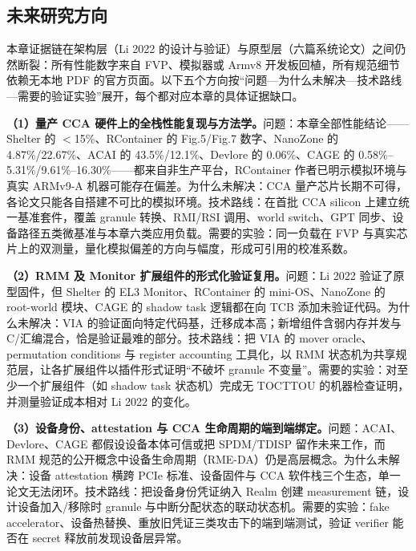 \documentclass[11pt]{ctexart}
\begin{document}
\subsection{未来研究方向}
本章证据链在架构层（Li 2022 的设计与验证）与原型层（六篇系统论文）之间仍然断裂：所有性能数字来自 FVP、模拟器或 Armv8 开发板回植，所有规范细节依赖无本地 PDF 的官方页面。以下五个方向按“问题—为什么未解决—技术路线—需要的验证实验”展开，每个都对应本章的具体证据缺口。\par
\noindent\textbf{（1）量产 CCA 硬件上的全栈性能复现与方法学。}问题：本章全部性能结论——Shelter 的 $<$15\%\cite{zhang2023shelter}、RContainer 的 Fig.5/Fig.7 数字\cite{zhou2025rcontainer}、NanoZone 的 4.87\%/22.67\%\cite{liu2025nanozone}、ACAI 的 43.5\%/12.1\%\cite{acai2023}、Devlore 的 0.06\%\cite{bertschi2026devlore}、CAGE 的 0.58\%--5.31\%/9.61\%--16.30\%\cite{wang2026cage}——都来自非生产平台，RContainer 作者已明示模拟环境与真实 ARMv9-A 机器可能存在偏差。为什么未解决：CCA 量产芯片长期不可得，各论文只能各自搭建不可比的模拟环境。技术路线：在首批 CCA silicon 上建立统一基准套件，覆盖 granule 转换、RMI/RSI 调用、world switch、GPT 同步、设备路径五类微基准与本章六类应用负载。需要的实验：同一负载在 FVP 与真实芯片上的双测量，量化模拟偏差的方向与幅度，形成可引用的校准系数。\par
\noindent\textbf{（2）RMM 及 Monitor 扩展组件的形式化验证复用。}问题：Li 2022 验证了原型固件，但 Shelter 的 EL3 Monitor、RContainer 的 mini-OS、NanoZone 的 root-world 模块、CAGE 的 shadow task 逻辑都在向 TCB 添加未验证代码\cite{li2022cca,zhang2023shelter,zhou2025rcontainer,liu2025nanozone,wang2026cage}。为什么未解决：VIA 的验证面向特定代码基，迁移成本高；新增组件含弱内存并发与 C/汇编混合，恰是验证最难的部分。技术路线：把 VIA 的 mover oracle、permutation conditions 与 register accounting 工具化，以 RMM 状态机为共享规范层，让各扩展组件以插件形式证明“不破坏 granule 不变量”。需要的实验：对至少一个扩展组件（如 shadow task 状态机）完成无 TOCTTOU 的机器检查证明，并测量验证成本相对 Li 2022 的变化。\par
\noindent\textbf{（3）设备身份、attestation 与 CCA 生命周期的端到端绑定。}问题：ACAI、Devlore、CAGE 都假设设备本体可信或把 SPDM/TDISP 留作未来工作\cite{acai2023,bertschi2026devlore,wang2026cage}，而 RMM 规范的公开概念中设备生命周期（RME-DA）仍是高层概念\cite{arm_rmm_spec,arm_cca_spec}。为什么未解决：设备 attestation 横跨 PCIe 标准、设备固件与 CCA 软件栈三个生态，单一论文无法闭环。技术路线：把设备身份凭证纳入 Realm 创建 measurement 链，设计设备加入/移除时 granule 与中断分配状态的联动状态机。需要的实验：fake accelerator、设备热替换、重放旧凭证三类攻击下的端到端测试，验证 verifier 能否在 secret 释放前发现设备层异常。\par
\end{document}
